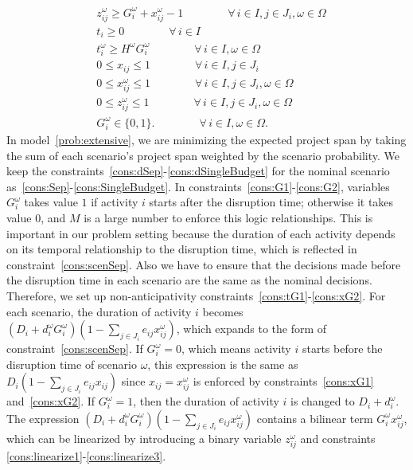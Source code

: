 \documentclass[11pt]{article}
\begin{document}
\begin{subequations}
\begin{align}
		& z_{ij}^\omega \geq G_i^\omega + x_{ij}^\omega - 1 \qquad \qquad \forall \,i \in I, j \in J_i, \omega \in \Omega \label{cons:linearize3}\\
		& t_i \geq 0 \qquad \qquad \forall \,i \in I \label{cons:nonnegt}\\
		& t_i^\omega \geq H^\omega G_i^\omega \qquad \qquad \forall\, i \in I, \omega \in \Omega \\
		& 0 \leq x_{ij} \leq 1 \qquad \qquad \forall \,i \in I, j \in J_i\\ 
		& 0 \leq x_{ij}^\omega \leq 1 \qquad \qquad \forall \,i \in I, j \in J_i, \omega \in \Omega\\
		& 0 \leq z_{ij}^\omega \leq 1 \qquad \qquad \forall \,i \in I, j \in J_i, \omega \in \Omega\\
		& G_i^\omega \in \{0,1\}. \qquad \qquad \forall \,i \in I, \omega \in \Omega.
		\end{align}
	\end{subequations}
	In model~\eqref{prob:extensive}, we are minimizing the expected project span by taking the sum of each scenario's project span weighted by the scenario probability. We keep the constraints~\eqref{cons:dSep}-\eqref{cons:dSingleBudget} for the nominal scenario as~\eqref{cons:Sep}-\eqref{cons:SingleBudget}. In constraints~\eqref{cons:G1}-\eqref{cons:G2}, variables \(G^\omega_i\) takes value \(1\) if activity \(i\) starts after the disruption time; otherwise it takes value 0, and \(M\) is a large number to enforce this logic relationships. This is important in our problem setting because the duration of each activity depends on its temporal relationship to the disruption time, which is reflected in constraint~\eqref{cons:scenSep}. Also we have to ensure that the decisions made before the disruption time in each scenario are the same as the nominal decisions. Therefore, we set up non-anticipativity constraints~\eqref{cons:tG1}-\eqref{cons:xG2}. For each scenario, the duration of activity \(i\) becomes \((D_i + d_i^\omega G_i^\omega)(1 - \sum_{j \in J_i} e_{ij}x_{ij}^\omega)\), which expands to the form of constraint~\eqref{cons:scenSep}. If \(G_i^\omega = 0\), which means activity \(i\) starts before the disruption time of scenario \(\omega\), this expression is the same as \(D_i (1 - \sum_{j \in J_i} e_{ij}x_{ij})\) since \(x_{ij} = x_{ij}^\omega\) is enforced by constraints~\eqref{cons:xG1} and~\eqref{cons:xG2}. If \(G_i^\omega = 1\), then the duration of activity \(i\) is changed to \(D_i + d_i^\omega\). The expression \((D_i + d_i^\omega G_i^\omega)(1 - \sum_{j \in J_i} e_{ij}x_{ij}^\omega)\) contains a bilinear term \(G_i^\omega x_{ij}^\omega\), which can be linearized by introducing a binary variable \(z_{ij}^\omega\) and constraints \eqref{cons:linearize1}-\eqref{cons:linearize3}.
	
\end{document}
